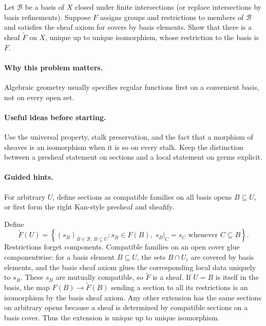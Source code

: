 \begin{problem}
Let $\mathcal B$ be a basis of $X$ closed under finite intersections (or replace intersections by basis refinements). Suppose $F$ assigns groups and restrictions to members of $\mathcal B$ and satisfies the sheaf axiom for covers by basis elements. Show that there is a sheaf $\widetilde F$ on $X$, unique up to unique isomorphism, whose restriction to the basis is $F$.
\end{problem}

\paragraph{Why this problem matters.}
Algebraic geometry usually specifies regular functions first on a convenient basis, not on every open set.

\paragraph{Useful ideas before starting.}
Use the universal property, stalk preservation, and the fact that a morphism of sheaves is an isomorphism when it is so on every stalk.  Keep the distinction between a presheaf statement on sections and a local statement on germs explicit.

\paragraph{Guided hints.}
For arbitrary $U$, define sections as compatible families on all basis opens $B\subseteq U$, or first form the right Kan-style presheaf and sheafify.

\ifdefined\FullProblemDossiers
\begin{solution}
Define
\[
\widetilde F(U)=\left\{(s_B)_{B\in\mathcal B,\,B\subseteq U}: s_B\in F(B),\; s_B|_C=s_C\text{ whenever }C\subseteq B\right\}.
\]
Restrictions forget components. Compatible families on an open cover glue componentwise: for a basis element $B\subseteq U$, the sets $B\cap U_i$ are covered by basis elements, and the basis sheaf axiom glues the corresponding local data uniquely to $s_B$. These $s_B$ are mutually compatible, so $\widetilde F$ is a sheaf. If $U=B$ is itself in the basis, the map $F(B)\to\widetilde F(B)$ sending a section to all its restrictions is an isomorphism by the basis sheaf axiom. Any other extension has the same sections on arbitrary opens because a sheaf is determined by compatible sections on a basis cover. Thus the extension is unique up to unique isomorphism.
\end{solution}

